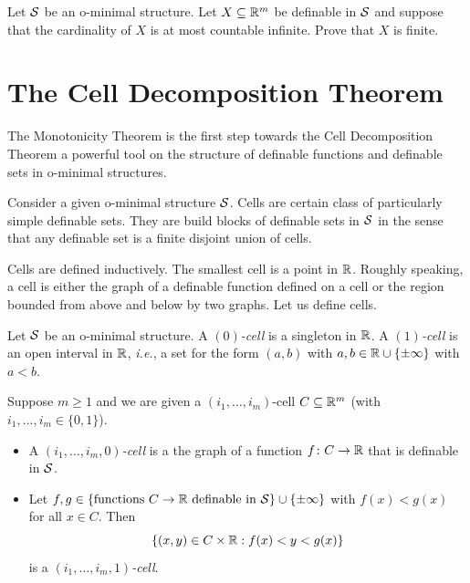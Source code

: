 \begin{exercise}
  Let ${\mathcal S}$ be an o-minimal structure. 
  Let $X\subseteq{\mathbb{R}}^m$ be definable in ${\mathcal S}$ and suppose that the
  cardinality of $X$ is at most countable infinite. Prove that $X$ is
  finite. 
\end{exercise}


\section{The Cell Decomposition Theorem}

The Monotonicity Theorem is the first step towards the Cell
Decomposition Theorem a powerful tool on the structure of definable
functions and definable sets in o-minimal structures.

Consider a given o-minimal structure ${\mathcal S}$. Cells are certain class of
particularly simple definable sets. They are build blocks of definable
sets in ${\mathcal S}$ in the sense that any definable set is a finite disjoint
union of cells.

Cells are defined inductively. The smallest cell is a point in ${\mathbb{R}}$.
Roughly speaking, a cell is either the graph of a
definable function defined on a cell or the region bounded from above
and below by two graphs. 
Let us define cells.

\begin{definition}
  Let ${\mathcal S}$ be an o-minimal structure. 
  A \emph{$(0)$-cell} is a singleton in ${\mathbb{R}}$. A \emph{$(1)$-cell} is an open
  interval in ${\mathbb{R}}$, \textit{i.e.}, a set for the form $(a,b)$ with
  $a,b\in {\mathbb{R}}\cup\{\pm\infty\}$ with $a<b$.

  Suppose $m\ge 1$ and we are given a $(i_1,\ldots,i_m)$-cell
  $C\subseteq{\mathbb{R}}^m$
  (with $i_1,\ldots,i_m\in
  \{0,1\}$).  
  \begin{itemize}
  \item A \emph{$(i_1,\ldots,i_m,0)$-cell} is a the graph of a function
    $f\colon C\rightarrow {\mathbb{R}}$ that is definable in ${\mathcal S}$.
  \item Let $f,g\in \{\text{functions }C\rightarrow {\mathbb{R}} \text{ definable
      in ${\mathcal S}$}\}\cup\{\pm\infty\}$  with $f(x) < g(x)$ for all $x\in C$. 
    Then
    \begin{equation*}
      \{(x,y)\in C\times {\mathbb{R}} : f(x) < y <
      g(x)  \}
    \end{equation*}
    is a \emph{$(i_1,\ldots,i_m,1)$-cell}.
  \end{itemize}
\end{definition}

